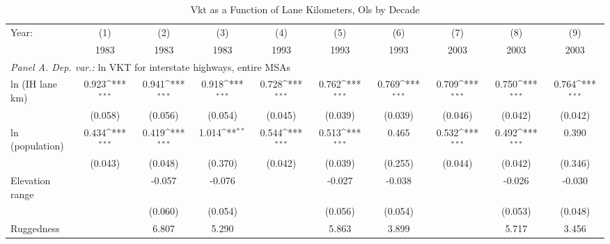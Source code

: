 \begin{table}[htbp]\centering
\def\sym#1{\ifmmode^{#1}\else\(^{#1}\)\fi}
\caption{Vkt
as
a
Function
of
Lane
Kilometers,
Ols
by
Decade}
\begin{tabular}{l*{9}{c}}
\hline\hline
Year:
                    &\multicolumn{1}{c}{(1)}&\multicolumn{1}{c}{(2)}&\multicolumn{1}{c}{(3)}&\multicolumn{1}{c}{(4)}&\multicolumn{1}{c}{(5)}&\multicolumn{1}{c}{(6)}&\multicolumn{1}{c}{(7)}&\multicolumn{1}{c}{(8)}&\multicolumn{1}{c}{(9)}\\
                    &\multicolumn{1}{c}{1983}&\multicolumn{1}{c}{1983}&\multicolumn{1}{c}{1983}&\multicolumn{1}{c}{1993}&\multicolumn{1}{c}{1993}&\multicolumn{1}{c}{1993}&\multicolumn{1}{c}{2003}&\multicolumn{1}{c}{2003}&\multicolumn{1}{c}{2003}\\
 \hline \multicolumn{9}{l}{ \emph{Panel A. Dep. var.:} ln VKT for interstate  highways, entire MSAs} \\ 
ln (IH lane km)     &       0.923\sym{***}&       0.941\sym{***}&       0.918\sym{***}&       0.728\sym{***}&       0.762\sym{***}&       0.769\sym{***}&       0.709\sym{***}&       0.750\sym{***}&       0.764\sym{***}\\
                    &     (0.058)         &     (0.056)         &     (0.054)         &     (0.045)         &     (0.039)         &     (0.039)         &     (0.046)         &     (0.042)         &     (0.042)         \\
[1em]
ln (population)     &       0.434\sym{***}&       0.419\sym{***}&       1.014\sym{**} &       0.544\sym{***}&       0.513\sym{***}&       0.465         &       0.532\sym{***}&       0.492\sym{***}&       0.390         \\
                    &     (0.043)         &     (0.048)         &     (0.370)         &     (0.042)         &     (0.039)         &     (0.255)         &     (0.044)         &     (0.042)         &     (0.346)         \\
[1em]
Elevation range     &                     &      -0.057         &      -0.076         &                     &      -0.027         &      -0.038         &                     &      -0.026         &      -0.030         \\
                    &                     &     (0.060)         &     (0.054)         &                     &     (0.056)         &     (0.054)         &                     &     (0.053)         &     (0.048)         \\
[1em]
Ruggedness          &                     &       6.807         &       5.290         &                     &       5.863         &       3.899         &                     &       5.717         &       3.456         \\

\end{tabular}
\end{table}
